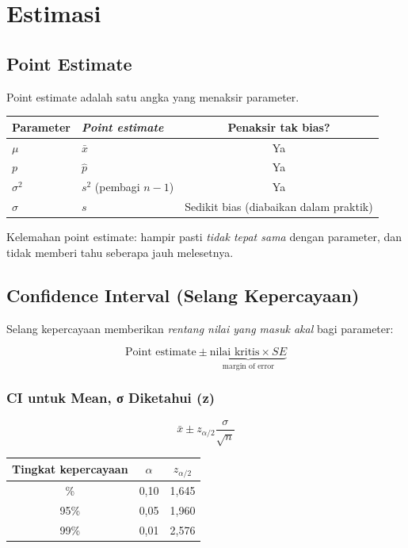 \documentclass[
  indonesian,
  letterpaper,
]{book}
\newcounter{none} %
\begin{document}

\chapter{Estimasi}\label{estimasi}

\section{Point Estimate}\label{point-estimate}

Point estimate adalah satu angka yang menaksir parameter.

{\def\LTcaptype{none} %
\begin{longtable}[]{@{}llc@{}}
\toprule\noalign{}
Parameter & \emph{Point estimate} & Penaksir tak bias? \\
\midrule\noalign{}
\endhead
\bottomrule\noalign{}
\endlastfoot
\(\mu\) & \(\bar{x}\) & Ya \\
\(p\) & \(\hat{p}\) & Ya \\
\(\sigma^2\) & \(s^2\) (pembagi \(n - 1\)) & Ya \\
\(\sigma\) & \(s\) & Sedikit bias (diabaikan dalam praktik) \\
\end{longtable}
}

Kelemahan point estimate: hampir pasti \emph{tidak tepat sama} dengan
parameter, dan tidak memberi tahu seberapa jauh melesetnya.

\section{Confidence Interval (Selang
Kepercayaan)}\label{confidence-interval-selang-kepercayaan}

Selang kepercayaan memberikan \emph{rentang nilai yang masuk akal} bagi
parameter:

\[\text{Point estimate} \pm \underbrace{\text{nilai kritis} \times SE}_{\text{margin of error}}\]

\subsection{CI untuk Mean, σ Diketahui
(z)}\label{ci-untuk-mean-ux3c3-diketahui-z}

\[\bar{x} \pm z_{\alpha/2} \frac{\sigma}{\sqrt{n}}\]

{\def\LTcaptype{none} %
\begin{longtable}[]{@{}ccc@{}}
\toprule\noalign{}
Tingkat kepercayaan & \(\alpha\) & \(z_{\alpha/2}\) \\
\midrule\noalign{}
\endhead
\bottomrule\noalign{}
\endlastfoot
90\% & 0,10 & 1,645 \\
95\% & 0,05 & 1,960 \\
99\% & 0,01 & 2,576 \\
\end{longtable}
}
\end{document}
